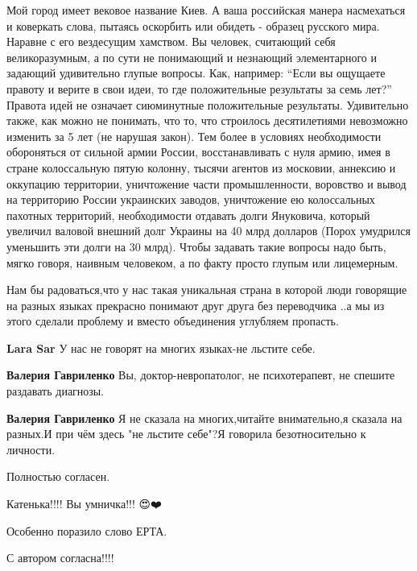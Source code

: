 \begin{itemize}
\begin{itemize}
Мой город имеет вековое название Киев. А ваша российская манера насмехаться и
коверкать слова, пытаясь оскорбить или обидеть - образец русского мира. Наравне
с его вездесущим хамством. Вы человек, считающий себя великоразумным, а по сути
не понимающий и незнающий элементарного и задающий удивительно глупые вопросы.
Как, например: \enquote{Если вы ощущаете правоту и верите в свои идеи, то где
положительные результаты за семь лет?} Правота идей не означает сиюминутные
положительные результаты. Удивительно также, как можно не понимать, что то, что
строилось десятилетиями невозможно изменить за 5 лет (не нарушая закон). Тем
более в условиях необходимости обороняться от сильной армии России,
восстанавливать с нуля армию, имея в стране колоссальную пятую колонну, тысячи
агентов из московии, аннексию и оккупацию территории, уничтожение части
промышленности, воровство и вывод на территорию России украинских заводов,
уничтожение ею колоссальных пахотных территорий, необходимости отдавать долги
Януковича, который увеличил валовой внешний долг Украины на 40 млрд долларов
(Порох умудрился уменьшить эти долги на 30 млрд). Чтобы задавать такие вопросы
надо быть, мягко говоря, наивным человеком, а по факту просто глупым или
лицемерным.

\end{itemize}

Нам бы радоваться,что у нас такая уникальная страна в которой люди говорящие на разных языках прекрасно понимают друг друга без переводчика ..а мы из этого сделали проблему и вместо объединения углубляем пропасть.

\begin{itemize}
\textbf{Lara Sar} У нас не говорят на многих языках-не льстите себе.

\textbf{Валерия Гавриленко} Вы, доктор-невропатолог, не психотерапевт, не спешите раздавать диагнозы.

\textbf{Валерия Гавриленко} Я не сказала на многих,читайте внимательно,я сказала на разных.И при чём здесь "не льстите себе"?Я говорила безотносительно к личности.
\end{itemize}

Полностью согласен.

Катенька!!!! Вы умничка!!! 😍❤️🌹😘😘😘

Особенно поразило слово ЕРТА.

С автором согласна!!!!


\end{itemize}
